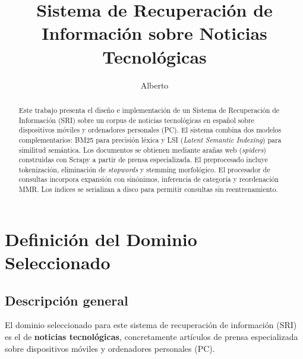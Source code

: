 \documentclass{llncs}
\begin{document}
\title{Sistema de Recuperación de Información sobre Noticias Tecnológicas}

\author{Alberto}


\maketitle

\begin{abstract}
Este trabajo presenta el diseño e implementación de un Sistema de Recuperación
de Información (SRI) sobre un corpus de noticias tecnológicas en español sobre
dispositivos móviles y ordenadores personales (PC). El sistema combina dos
modelos complementarios: BM25 para precisión léxica y LSI (\textit{Latent
Semantic Indexing}) para similitud semántica. Los documentos se obtienen
mediante arañas web (\textit{spiders}) construidas con Scrapy a partir de
prensa especializada. El preprocesado incluye tokenización, eliminación de
\textit{stopwords} y stemming morfológico. El procesador de consultas
incorpora expansión con sinónimos, inferencia de categoría y reordenación MMR.
Los índices se serializan a disco para permitir consultas sin reentrenamiento.
\end{abstract}


\section{Definición del Dominio Seleccionado}

\subsection{Descripción general}

El dominio seleccionado para este sistema de recuperación de información (SRI)
es el de \textbf{noticias tecnológicas}, concretamente artículos de prensa
especializada sobre dispositivos móviles y ordenadores personales (PC).
\end{document}
